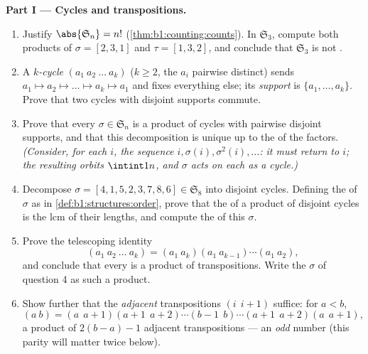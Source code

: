 \begin{problem}
\medskip
\noindent\textbf{Part I --- Cycles and transpositions.}
\begin{enumerate}
  \item Justify $\abs{\mathfrak S_n} = n!$
        (\cref{thm:b1:counting:counts}). In $\mathfrak S_3$,
        compute both products of $\sigma = [2, 3, 1]$ and $\tau =
        [1, 3, 2]$, and conclude that $\mathfrak S_3$ is not
        .
  \item A \emph{$k$-cycle} $(a_1\ a_2\ \dots\ a_k)$ ($k \geq 2$,
        the $a_i$ pairwise distinct) sends $a_1 \mapsto a_2
        \mapsto \dots \mapsto a_k \mapsto a_1$ and fixes
        everything else; its \emph{support} is $\{a_1, \dots,
        a_k\}$. Prove that two cycles with disjoint supports
        commute.
  \item Prove that every $\sigma \in \mathfrak S_n$ is a product
        of cycles with pairwise disjoint supports, and that this
        decomposition is unique up to the  of the factors.
        \emph{(Consider, for each $i$, the sequence $i, \sigma(i),
        \sigma^2(i), \dots$: it must return to $i$; the resulting
        \emph{orbits}  $\intint1n$, and $\sigma$ acts on
        each as a cycle.)}
  \item Decompose $\sigma = [4, 1, 5, 2, 3, 7, 8, 6] \in
        \mathfrak S_8$ into disjoint cycles. Defining the
        \emph{} of $\sigma$ as in
        \cref{def:b1:structures:order}, prove that the  of a
        product of disjoint cycles is the lcm of their lengths,
        and compute the  of this $\sigma$.
  \item Prove the telescoping identity
        \[
        (a_1\ a_2\ \dots\ a_k)
        = (a_1\ a_k)(a_1\ a_{k-1})\cdots(a_1\ a_2) ,
        \]
        and conclude that every  is a product of
        transpositions. Write the $\sigma$ of question 4 as such a
        product.
  \item Show further that the \emph{adjacent} transpositions
        $(i\ \ i{+}1)$ suffice: for $a < b$,
        \[
        (a\ b) = (a\ \ a{+}1)(a{+}1\ \ a{+}2)\cdots(b{-}1\ \ b)
        \cdots(a{+}1\ \ a{+}2)(a\ \ a{+}1),
        \]
        a product of $2(b - a) - 1$ adjacent transpositions ---
        an \emph{odd} number (this parity will matter twice
        below).
\end{enumerate}


\end{problem}
